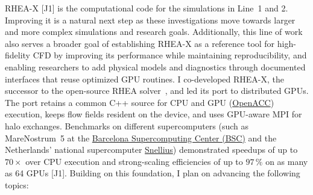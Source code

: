 \documentclass[11pt]{article}
\begin{document}
RHEA-X [J1] is the computational code for the simulations in Line~1 and 2. 
Improving it is a natural next step as these investigations move towards larger and more complex simulations and research goals. 
Additionally, this line of work also serves a broader goal of establishing RHEA-X as a reference tool for high-fidelity CFD by improving its performance while maintaining reproducibility, and enabling researchers to add physical models and diagnostics through documented interfaces that reuse optimized GPU routines.
I co-developed RHEA-X, the successor to the open-source RHEA solver~\cite{RHEASoftware}, and led its port to distributed GPUs. 
The port retains a common C++ source for CPU and GPU (\href{https://www.openacc.org/}{OpenACC}) execution, keeps flow fields resident on the device, and uses GPU-aware MPI for halo exchanges. 
Benchmarks on different supercomputers (such as MareNostrum~5 at the \href{https://www.bsc.es/}{Barcelona Supercomputing Center (BSC)} and the Netherlands' national supercomputer \href{https://www.surf.nl/en/services/compute/snellius-the-national-supercomputer}{Snellius}) demonstrated speedups of up to $70\times$ over CPU execution and strong-scaling efficiencies of up to $97\,\%$ on as many as 64 GPUs [J1]. 
Building on this foundation, I plan on advancing the following topics:
\end{document}
